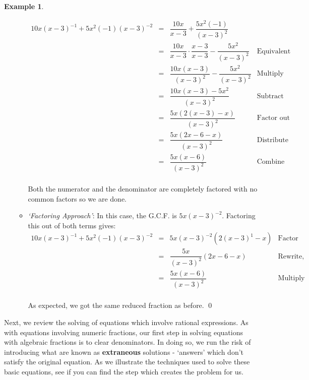 \documentclass[11pt]{article}
\theoremstyle{definition}  %
\newtheorem{ex}{\bf Example}
\begin{document}
\begin{ex}
\begin{enumerate}
\begin{itemize}
\[\begin{array}{rclr}
10x(x-3)^{-1} + 5x^2(-1)(x-3)^{-2} & = & \dfrac{10x}{x-3} + \dfrac{5x^2(-1)}{(x-3)^2} & \\ [10pt]
                                   & = & \dfrac{10x}{x-3} \cdot \dfrac{x-3}{x-3} - \dfrac{5x^2}{(x-3)^2} & \text{Equivalent Fractions} \\ [10pt]
																	 & = & \dfrac{10x(x-3)}{(x-3)^2} - \dfrac{5x^2}{(x-3)^2} & \text{Multiply} \\ [10pt]
																	 & = & \dfrac{10x(x-3) - 5x^2}{(x-3)^2} & \text{Subtract} \\ [10pt]
																	 & = & \dfrac{5x(2(x-3) - x)}{(x-3)^2} & \text{Factor out G.C.F.} \\ [10pt]
																	 & = & \dfrac{5x(2x-6-x)}{(x-3)^2} & \text{Distribute} \\ [10pt]
																	 & = & \dfrac{5x(x-6)}{(x-3)^2} & \text{Combine like terms} \\
																	
\end{array} \]

Both the numerator and the denominator are completely factored with no common factors so we are done.

\item  \textit{`Factoring Approach'}: In this case, the G.C.F. is $5x(x-3)^{-2}$.  Factoring this out of both terms gives: \[ \begin{array}{rclr}

10x(x-3)^{-1} + 5x^2(-1)(x-3)^{-2} & = & 5x(x-3)^{-2}(2(x-3)^{1} - x) & \text{Factor} \\ [8pt]
                                  & = & \dfrac{5x}{(x-3)^2} (2x-6 - x) & \text{Rewrite, distribute}\\ [12pt]
																	& = & \dfrac{5x(x-6)}{(x-3)^2} & \text{Multiply}\\ \end{array}\]

As expected, we got the same reduced fraction as before. \qed
\end{itemize}
																
\end{enumerate}

\end{ex}


Next, we review the solving of equations which involve rational expressions.  As with equations involving numeric fractions, our first step in solving equations with algebraic fractions is to clear denominators.  In doing so, we run the risk of introducing what are known as \textbf{extraneous} solutions - `answers' which don't satisfy the original equation.  As we illustrate the techniques used to solve these basic equations, see if you can find the step which creates the problem for us.
\end{document}
